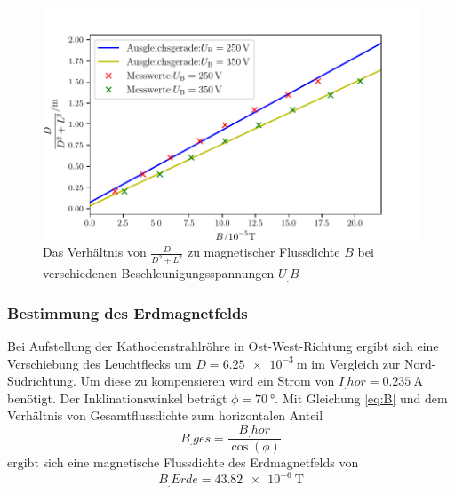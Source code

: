 \begin{figure}
\centering
\includegraphics[width=\linewidth-70pt,height=\textheight-70pt,keepaspectratio]{content/images/GraphMag1.pdf}
\caption{Das Verhältnis von $\frac{D}{D^2+L^2}$ zu magnetischer Flussdichte $B$ bei verschiedenen Beschleunigungsspannungen $U_.B$}\label{fig:Mag}
\end{figure}
\subsubsection{Bestimmung des Erdmagnetfelds}
Bei Aufstellung der Kathodenstrahlröhre in Ost-West-Richtung ergibt sich eine Verschiebung des Leuchtflecks um $D=\SI{6,25e-3}{\metre}$ im Vergleich zur Nord-Südrichtung.
Um diese zu kompensieren wird ein Strom von $I_.{hor}=\SI{0,235}{\ampere}$ benötigt. Der Inklinationswinkel beträgt $\phi=\SI{70}{\degree}$. Mit Gleichung \eqref{eq:B}
und dem Verhältnis von Gesamtflussdichte zum horizontalen Anteil
\[
B_.{ges}= \frac{B_.{hor}}{\cos(\phi)}
\]
ergibt sich eine magnetische Flussdichte des Erdmagnetfelds von
\[
B_.{Erde}=\SI{43,82e-6}{\tesla}
\]
